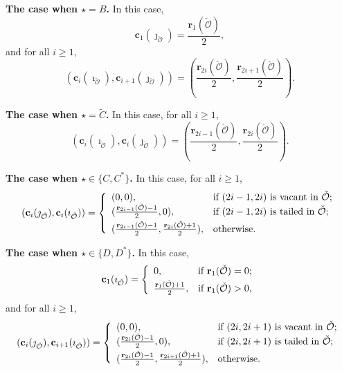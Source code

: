 \documentclass[12pt,a4paper]{amsart}
\newcommand{\CO}{{\mathcal {O}}}
\numberwithin{equation}{section}
\theoremstyle{remark}
\begin{document}
\medskip

\noindent
{\bf The case when $\star=B$.} In this case,
 \[
   \mathbf c_{1}(\jmath_{\check \CO})=\frac{\mathbf r_1(\check \CO)}{2},
\]
and for all $i\geq 1$,
\[
(\mathbf c_{i}(\imath_{\check \CO}), \mathbf c_{i+1}(\jmath_{\check \CO}))=
            (\frac{\mathbf r_{2i}(\check \CO)}{2},  \frac{\mathbf r_{2i+1}(\check \CO)}{2}).
\]

\medskip

\noindent
{\bf The case when $\star=\widetilde C$.} In this case, for all $i\geq 1$,
\[
(\mathbf c_{i}(\imath_{\check \CO}), \mathbf c_{i}(\jmath_{\check \CO}))=
            (\frac{\mathbf r_{2i-1}(\check \CO)}{2},  \frac{\mathbf r_{2i}(\check \CO)}{2}).
\]

\medskip

\noindent
{\bf The case when $\star\in \{C,C^*\}$.} In this case, for all $i\geq 1$,
\[
(\mathbf c_{i}(\jmath_{\check \CO}), \mathbf c_{i}(\imath_{\check \CO}))=
   \left\{
     \begin{array}{ll}
        (0,  0), &\hbox{if $(2i-1, 2i)$ is vacant  in $\check \CO$};\\
        (\frac{\mathbf r_{2i-1}(\check \CO)-1}{2},  0), & \hbox{if $(2i-1, 2i)$ is tailed in $\check \CO$};\smallskip\\
                  (\frac{\mathbf r_{2i-1}(\check \CO)-1}{2},  \frac{\mathbf r_{2i}(\check \CO)+1}{2}), &\hbox{otherwise}.\\
            \end{array}
   \right.
\]
\medskip

\noindent
{\bf The case when $\star\in \{D,D^*\}$.} In this case,
 \[
   \mathbf c_{1}(\imath_{\check \CO})= \left\{
     \begin{array}{ll}
      0,  &\hbox{if $\mathbf r_1(\check \CO)=0$}; \smallskip\\
       \frac{\mathbf r_1(\check \CO)+1}{2},   &\hbox{if $\mathbf r_1(\check \CO)>0$},\\
            \end{array}
   \right.
 \]
and for all $i\geq 1$,
\[
(\mathbf c_{i}(\jmath_{\check \CO}), \mathbf c_{i+1}(\imath_{\check \CO}))=
   \left\{
     \begin{array}{ll}
        (0,  0), &\hbox{if $(2i, 2i+1)$ is vacant in $\check \CO$};\\
        (\frac{\mathbf r_{2i}(\check \CO)-1}{2},  0), & \hbox{if $(2i, 2i+1)$ is tailed in $\check \CO$};\smallskip\\
                  (\frac{\mathbf r_{2i}(\check \CO)-1}{2},  \frac{\mathbf r_{2i+1}(\check \CO)+1}{2}), &\hbox{otherwise}.\\
            \end{array}
   \right.
\]
\end{document}
